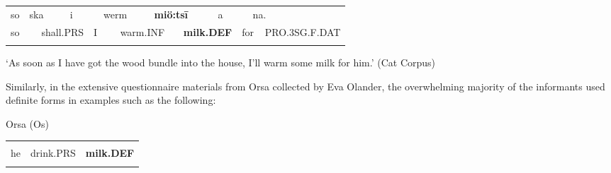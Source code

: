 \begin{tabular}{llllllllllllll}
\lsptoprule
so & \multicolumn{2}{l}{ska

} & \multicolumn{2}{l}{i

} & \multicolumn{2}{l}{werm

} & \multicolumn{2}{l}{{\bfseries miö:ts\={i}}

} & \multicolumn{2}{l}{a

} & \multicolumn{2}{l}{na.

} & \\
\multicolumn{2}{l}{so

} & \multicolumn{2}{l}{shall.PRS

} & \multicolumn{2}{l}{I

} & \multicolumn{2}{l}{warm.INF

} & \multicolumn{2}{l}{{\bfseries milk.DEF}

} & \multicolumn{2}{l}{for

} & \multicolumn{2}{l}{PRO.3SG.F.DAT

}\\
\lspbottomrule
\end{tabular}

\begin{styleTranslation}
 ‘As soon as I have got the wood bundle into the house, I’ll warm some milk for him.’ (Cat Corpus)

\end{styleTranslation}

\begin{styleBodyTextFirst}
Similarly, in the extensive questionnaire materials from Orsa collected by Eva Olander, the overwhelming majority of the informants used definite forms in examples such as the following:

\end{styleBodyTextFirst}


\begin{listWWNumileveli}
\item {}

\begin{styleExample}
Orsa (Os)

\end{styleExample}

\end{listWWNumileveli}

\begin{tabular}{lll}
\lsptoprule
\multicolumn{3}{l}{An

}\\
he & drink.PRS & {\bfseries milk.DEF}\\
\lspbottomrule
\end{tabular}


